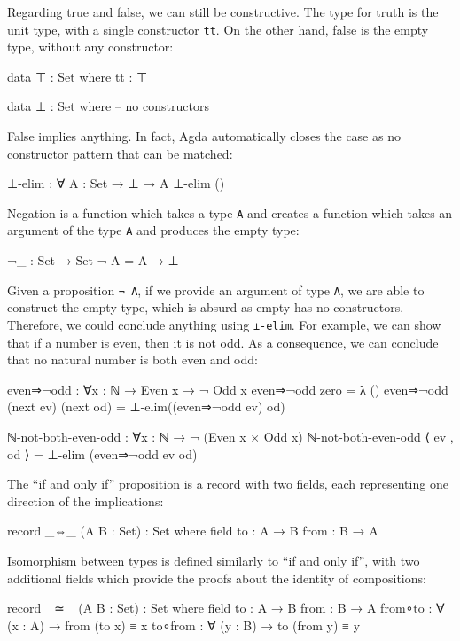 Regarding true and false, we can still be constructive. The type for truth is the unit type, with a single constructor \texttt{tt}. On the other hand, false is the empty type, without any constructor: 
\begin{agda}
data ⊤ : Set where
  tt : ⊤

data ⊥ : Set where
-- no constructors
\end{agda}

False implies anything. In fact, Agda automatically closes the case as no constructor pattern that can be matched:
\begin{agda}
⊥-elim : ∀ {A : Set}
  → ⊥
  → A
⊥-elim ()
\end{agda}
Negation is a function which takes a type \texttt{A} and creates a function which takes an argument of the type \texttt{A} and produces the empty type:
\begin{agda}
¬_ : Set → Set
¬ A = A → ⊥
\end{agda}
Given a proposition \texttt{¬ A}, if we provide an argument of type \texttt{A}, we are able to construct the empty type, which is absurd as empty has no constructors. Therefore, we could conclude anything using \texttt{⊥-elim}. For example, we can show that if a number is even, then it is not odd. As a consequence, we can conclude that no natural number is both even and odd:
\begin{agda}
even⇒¬odd : ∀{x : ℕ} → Even x → ¬ Odd x
even⇒¬odd zero = λ ()
even⇒¬odd (next ev) (next od) = ⊥-elim((even⇒¬odd ev) od)

ℕ-not-both-even-odd : ∀{x : ℕ} → ¬ (Even x × Odd x)
ℕ-not-both-even-odd ⟨ ev , od ⟩ = ⊥-elim (even⇒¬odd ev od)
\end{agda}

The ``if and only if'' proposition is a record with two fields, each representing one direction of the implications:
\begin{agda}
record _⇔_ (A B : Set) : Set where
  field
    to   : A → B
    from : B → A
\end{agda}

Isomorphism between types is defined similarly to ``if and only if'', with two additional fields which provide the proofs about the identity of compositions:
\begin{agda}
record _≃_ (A B : Set) : Set where
  field
    to   : A → B
    from : B → A
    from∘to : ∀ (x : A) → from (to x) ≡ x
    to∘from : ∀ (y : B) → to (from y) ≡ y
\end{agda}

